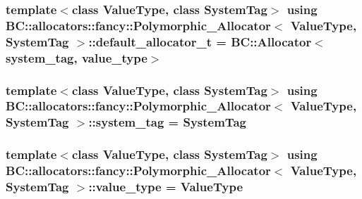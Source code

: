 \subsubsection[{\texorpdfstring{default\+\_\+allocator\+\_\+t}{default_allocator_t}}]{\setlength{\rightskip}{0pt plus 5cm}template$<$class Value\+Type, class System\+Tag$>$ using {\bf B\+C\+::allocators\+::fancy\+::\+Polymorphic\+\_\+\+Allocator}$<$ Value\+Type, System\+Tag $>$\+::{\bf default\+\_\+allocator\+\_\+t} =  {\bf B\+C\+::\+Allocator}$<${\bf system\+\_\+tag}, {\bf value\+\_\+type}$>$}\hypertarget{structBC_1_1allocators_1_1fancy_1_1Polymorphic__Allocator_ae8659fc3ca9a46797b846c0f452b2a1e}{}\label{structBC_1_1allocators_1_1fancy_1_1Polymorphic__Allocator_ae8659fc3ca9a46797b846c0f452b2a1e}
\subsubsection[{\texorpdfstring{system\+\_\+tag}{system_tag}}]{\setlength{\rightskip}{0pt plus 5cm}template$<$class Value\+Type, class System\+Tag$>$ using {\bf B\+C\+::allocators\+::fancy\+::\+Polymorphic\+\_\+\+Allocator}$<$ Value\+Type, System\+Tag $>$\+::{\bf system\+\_\+tag} =  System\+Tag}\hypertarget{structBC_1_1allocators_1_1fancy_1_1Polymorphic__Allocator_ad36b0511200ac81edc839dc908ee65c5}{}\label{structBC_1_1allocators_1_1fancy_1_1Polymorphic__Allocator_ad36b0511200ac81edc839dc908ee65c5}
\subsubsection[{\texorpdfstring{value\+\_\+type}{value_type}}]{\setlength{\rightskip}{0pt plus 5cm}template$<$class Value\+Type, class System\+Tag$>$ using {\bf B\+C\+::allocators\+::fancy\+::\+Polymorphic\+\_\+\+Allocator}$<$ Value\+Type, System\+Tag $>$\+::{\bf value\+\_\+type} =  Value\+Type}\hypertarget{structBC_1_1allocators_1_1fancy_1_1Polymorphic__Allocator_a644020fa0a4109c775c0ae7de878f518}{}\label{structBC_1_1allocators_1_1fancy_1_1Polymorphic__Allocator_a644020fa0a4109c775c0ae7de878f518}



